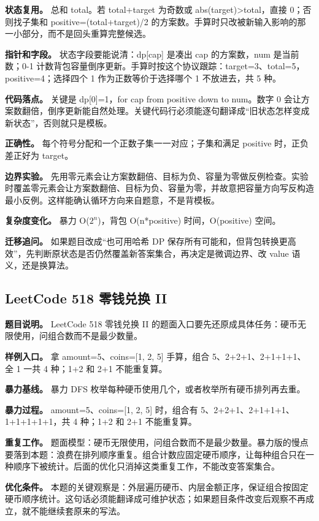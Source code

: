 \textbf{状态复用。} 总和 total。若 total+target 为奇数或 abs(target)>total，直接 0；否则找子集和 positive=(total+target)/2 的方案数。手算时只改被新输入影响的那一小部分，而不是回头重算完整候选。

\textbf{指针和字段。} 状态字段要能说清：dp[cap] 是凑出 cap 的方案数，num 是当前数；0-1 计数背包容量倒序更新。手算时按这个协议跟踪：target=3、total=5，positive=4；选择四个 1 作为正数等价于选择哪个 1 不放进去，共 5 种。

\textbf{代码落点。} 关键是 dp[0]=1，for cap from positive down to num。数字 0 会让方案数翻倍，倒序更新能自然处理。关键代码行必须能逐句翻译成“旧状态怎样变成新状态”，否则就只是模板。

\textbf{正确性。} 每个符号分配和一个正数子集一一对应；子集和满足 positive 时，正负差正好为 target。

\textbf{边界实验。} 先用零元素会让方案数翻倍、目标为负、容量为零做反例检查。实验时覆盖零元素会让方案数翻倍、目标为负、容量为零，并故意把容量方向写反构造最小反例。这样能确认循环方向来自题意，不是背模板。

\textbf{复杂度变化。} 暴力 O(\ensuremath{2^{n}})，背包 O(n*positive) 时间，O(positive) 空间。

\textbf{迁移追问。} 如果题目改成“也可用哈希 DP 保存所有可能和，但背包转换更高效”，先判断原状态是否仍然覆盖新答案集合，再决定是微调边界、改 value 语义，还是换算法。

\subsection{LeetCode 518 零钱兑换 II}

\textbf{题目说明。} LeetCode 518 零钱兑换 II 的题面入口要先还原成具体任务：硬币无限使用，问组合数而不是最少数量。

\textbf{样例入口。} 拿 amount=5、coins=[1, 2, 5] 手算，组合 5、2+2+1、2+1+1+1、全 1 一共 4 种；1+2 和 2+1 不能重复算。

\textbf{暴力基线。} 暴力 DFS 枚举每种硬币使用几个，或者枚举所有硬币排列再去重。

\textbf{暴力过程。} amount=5、coins=[1, 2, 5] 时，组合有 5、2+2+1、2+1+1+1、1+1+1+1+1，共 4 种；1+2 和 2+1 不能重复算。

\textbf{重复工作。} 题面模型：硬币无限使用，问组合数而不是最少数量。暴力版的慢点要落到本题：浪费在排列顺序重复。组合计数应固定硬币顺序，让每种组合只在一种顺序下被统计。后面的优化只消掉这类重复工作，不能改变答案集合。

\textbf{优化条件。} 本题的关键观察是：外层遍历硬币、内层金额正序，保证组合按固定硬币顺序统计。这句话必须能翻译成可维护状态；如果题目条件改变后观察不再成立，就不能继续套原来的写法。

